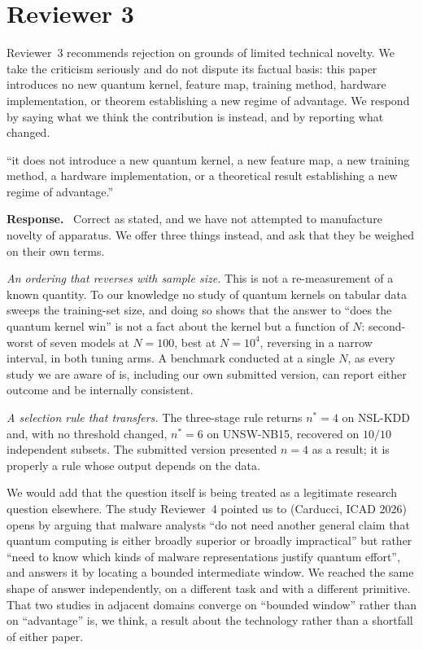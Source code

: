 \documentclass[11pt,a4paper]{article}
\newenvironment{revcomment}
  {\par\addvspace{6pt}\begingroup
   \color{quotegray}\itshape\small
   \begin{list}{}{%
     \setlength{\leftmargin}{1.8em}\setlength{\rightmargin}{1.0em}%
     \setlength{\topsep}{0pt}\setlength{\partopsep}{0pt}%
     \setlength{\parsep}{3pt}\setlength{\itemsep}{0pt}}%
   \item[]}
  {\end{list}\endgroup\normalcolor\addvspace{6pt}}
\newcommand{\itemhead}[2]{%
  \par\addvspace{15pt}%
  \noindent{\bfseries\color{tagink}#1}\hspace{0.7em}{\bfseries #2}%
  \par\addvspace{3.5pt}%
  \noindent{\color{rulegray}\rule{\linewidth}{0.5pt}}%
  \par\addvspace{5pt}%
  \nobreak}
\newcommand{\resp}{\par\addvspace{2pt}\noindent\textbf{Response.}\ }
\begin{document}
\section{Reviewer 3}

Reviewer~3 recommends rejection on grounds of limited technical novelty. We take
the criticism seriously and do not dispute its factual basis: this paper
introduces no new quantum kernel, feature map, training method, hardware
implementation, or theorem establishing a new regime of advantage. We respond by
saying what we think the contribution is instead, and by reporting what changed.

\itemhead{R3-1}{The model is a standard ZZFeatureMap configuration; technical
novelty is limited}
\begin{revcomment}
``it does not introduce a new quantum kernel, a new feature map, a new training
method, a hardware implementation, or a theoretical result establishing a new
regime of advantage.''
\end{revcomment}
\resp
Correct as stated, and we have not attempted to manufacture novelty of apparatus.
We offer three things instead, and ask that they be weighed on their own terms.

\emph{An ordering that reverses with sample size.} This is not a re-measurement
of a known quantity. To our knowledge no study of quantum kernels on tabular
data sweeps the training-set size, and doing so shows that the answer to
``does the quantum kernel win'' is not a fact about the kernel but a function of
$N$: second-worst of seven models at $N=100$, best at $N=10^{4}$, reversing in a
narrow interval, in both tuning arms. A benchmark conducted at a single $N$,
as every study we are aware of is, including our own submitted version, can
report either outcome and be internally consistent.

\emph{A selection rule that transfers.} The three-stage rule returns
$n^{\ast}=4$ on NSL-KDD and, with no threshold changed, $n^{\ast}=6$ on
UNSW-NB15, recovered on $10/10$ independent subsets. The submitted version
presented $n=4$ as a result; it is properly a rule whose output depends on the
data.

We would add that the question itself is being treated as a legitimate research
question elsewhere. The study Reviewer~4 pointed us to (Carducci, ICAD 2026)
opens by arguing that malware analysts ``do not need another general claim
that quantum computing is either broadly superior or broadly impractical'' but
rather ``need to know which kinds of malware representations justify quantum
effort'', and answers it by locating a bounded intermediate window. We reached the same shape of answer independently, on a
different task and with a different primitive. That two studies in adjacent
domains converge on ``bounded window'' rather than on ``advantage'' is, we
think, a result about the technology rather than a shortfall of either paper.
\end{document}

